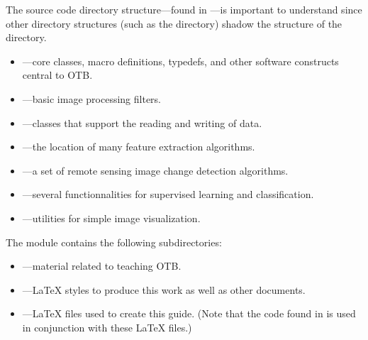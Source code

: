 The source code directory structure---found in ---is 
important to understand since other directory structures (such as the
 directory) shadow the structure of the
 directory.
\begin{itemize}
        \item {}---core classes, macro definitions,
        typedefs, and other software constructs central to OTB.
        \item {}---basic image processing
        filters.
        \item {}---classes that support the reading
        and writing of data.
	\item {}---the location of many
	feature extraction algorithms.
	\item {}---a set of remote
	sensing image change detection algorithms.
	\item {}---several functionnalities for
	supervised learning and classification.
	\item {}---utilities for simple image visualization.
	  
\end{itemize}

The  module contains the following subdirectories:
\begin{itemize}
        \item {}---material related to
        teaching OTB.
        \item {}---\LaTeX{} styles to produce this
        work as well as other documents.
        \item {}---\LaTeX{} files used to
        create this guide. (Note that the code found in
         is used in conjunction with these \LaTeX{}
        files.)
\end{itemize}

